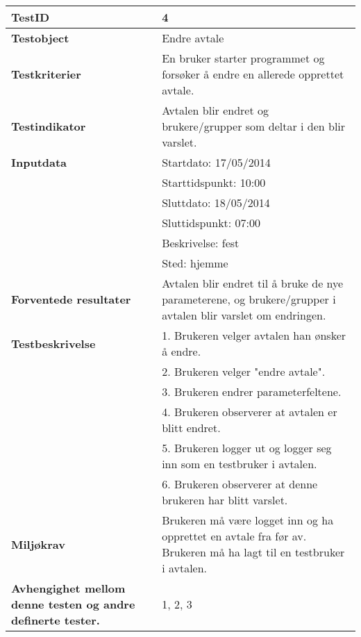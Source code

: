 	\begin{tabularx}{1.2\textwidth}{| p{5cm} | X |}
	\hline
	\textbf{TestID} 																& 4																	\\ \hline
	\textbf{Testobject} 															& Endre avtale															\\ \hline
	\textbf{Testkriterier} 															& En bruker starter programmet og forsøker å endre en allerede opprettet avtale.							\\ \hline
	\textbf{Testindikator} 															& Avtalen blir endret og brukere/grupper som deltar i den blir varslet.												\\ \hline
	\textbf{Inputdata} 															& Startdato: 17/05/2014\\
																			& Starttidspunkt: 10:00\\
																			& Sluttdato: 18/05/2014\\
																			& Sluttidspunkt: 07:00\\
																			& Beskrivelse: fest\\
																			& Sted: hjemme														\\  \hline
	\textbf{Forventede resultater}									 				& Avtalen blir endret til å bruke de nye parameterene, og brukere/grupper i avtalen blir varslet om endringen.				\\ \hline
	\textbf{Testbeskrivelse} 														& 1. Brukeren velger avtalen han ønsker å endre.\\
																			& 2. Brukeren velger "endre avtale".\\
																			& 3. Brukeren endrer parameterfeltene.\\
																			& 4. Brukeren observerer at avtalen er blitt endret.\\
																			& 5. Brukeren logger ut og logger seg inn som en testbruker i avtalen.\\
																			& 6. Brukeren observerer at denne brukeren har blitt varslet.					\\ \hline
	\textbf{Miljøkrav}			 												& Brukeren må være logget inn og ha opprettet en avtale fra før av. Brukeren må ha lagt til en testbruker i avtalen.						\\ \hline
	\textbf{Avhengighet mellom denne testen og andre definerte tester.}		 				& 1, 2, 3				 													\\ \hline
	\end{tabularx}

\mbox{}\\

